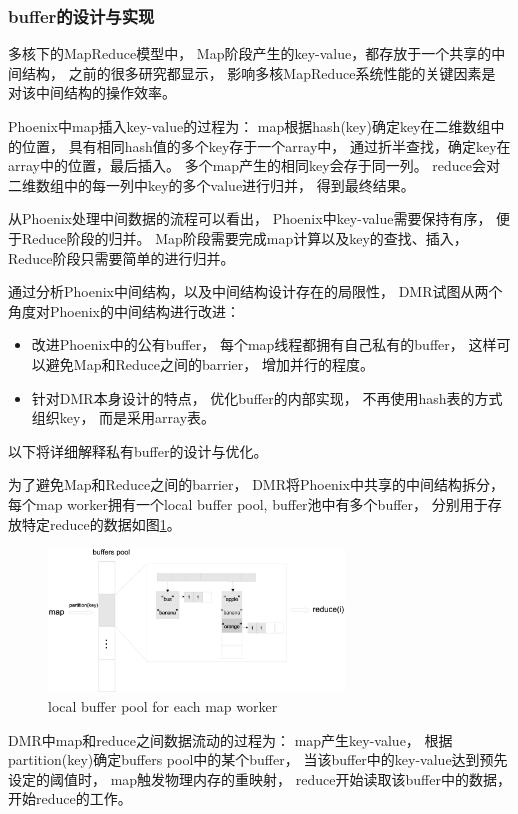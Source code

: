 \subsubsection{buffer的设计与实现}
多核下的MapReduce模型中，
Map阶段产生的key-value，都存放于一个共享的中间结构，
之前的很多研究都显示，
影响多核MapReduce系统性能的关键因素是
对该中间结构的操作效率\cite{mao2010metis}。

Phoenix中map插入key-value的过程为：
map根据hash(key)确定key在二维数组中的位置，
具有相同hash值的多个key存于一个array中，
通过折半查找，确定key在array中的位置，最后插入。
多个map产生的相同key会存于同一列。
reduce会对二维数组中的每一列中key的多个value进行归并，
得到最终结果。


从Phoenix处理中间数据的流程可以看出，
Phoenix中key-value需要保持有序，
便于Reduce阶段的归并。
Map阶段需要完成map计算以及key的查找、插入，
Reduce阶段只需要简单的进行归并。

通过分析Phoenix中间结构，以及中间结构设计存在的局限性，
DMR试图从两个角度对Phoenix的中间结构进行改进：
\begin{itemize}
  \item 改进Phoenix中的公有buffer，
  每个map线程都拥有自己私有的buffer，
  这样可以避免Map和Reduce之间的barrier，
  增加并行的程度。
  \item 针对DMR本身设计的特点，
  优化buffer的内部实现，
  不再使用hash表的方式组织key，
  而是采用array表。
\end{itemize}
以下将详细解释私有buffer的设计与优化。

为了避免Map和Reduce之间的barrier，
DMR将Phoenix中共享的中间结构拆分，
每个map worker拥有一个local buffer pool,
buffer池中有多个buffer，
分别用于存放特定reduce的数据如图\ref{dmr:buffers}。
\begin{figure}[!h!t]  
    \centering
    \includegraphics[width=0.7\textwidth]{img/dmr_buffers.eps}
    \caption{local buffer pool for each map worker}
    \label{dmr:buffers}
\end{figure}

DMR中map和reduce之间数据流动的过程为：
map产生key-value，
根据partition(key)确定buffers pool中的某个buffer，
当该buffer中的key-value达到预先设定的阈值时，
map触发物理内存的重映射，
reduce开始读取该buffer中的数据，
开始reduce的工作。

